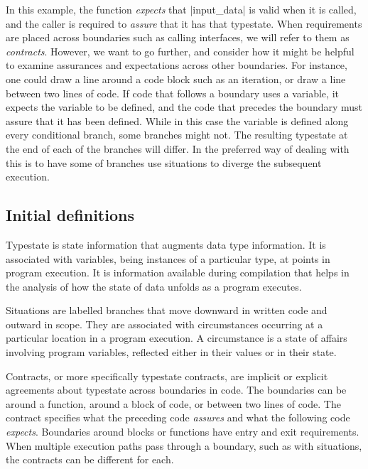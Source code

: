 \documentclass[10pt]{amsart}
\begin{document}
In this example, the function \emph{expects} that |input_data| is
valid when it is called, and the caller is required to \emph{assure}
that it has that typestate.  When requirements are placed across
boundaries such as calling interfaces, we will refer to them as
\emph{contracts}.  However, we want to go further, and consider how it
might be helpful to examine assurances and expectations across other
boundaries.  For instance, one could draw a line around a code block
such as an iteration, or draw a line between two lines of code.  If
code that follows a boundary uses a variable, it expects the variable
to be defined, and the code that precedes the boundary must assure
that it has been defined.  While in this case the variable is defined
along every conditional branch, some branches might not.  The
resulting typestate at the end of each of the branches will differ.
In \Utop the preferred way of dealing with this is to have some of
branches use situations to diverge the subsequent execution.


\subsection{Initial definitions}

\begin{defn}[Typestate]
  \label{defn:typestate1}%
  Typestate is state information that augments data type information.
  It is associated with variables, being instances of a particular
  type, at points in program execution.  It is information available
  during compilation that helps in the analysis of how the state of
  data unfolds as a program executes.
\end{defn}

\begin{defn}[Situations]
  \label{defn:situation1}%
  Situations are labelled branches that move downward in written code
  and outward in scope.
  They are associated with circumstances occurring at a particular
  location in a program execution.  A circumstance is a state of
  affairs involving program variables, reflected either in their
  values or in their state.
\end{defn}

\begin{defn}[Contracts]
  \label{defn:contract1}%
  Contracts, or more specifically typestate contracts, are implicit or
  explicit agreements about typestate across boundaries in code.  The
  boundaries can be around a function, around a block of code, or
  between two lines of code.  The contract specifies what the
  preceding code \emph{assures} and what the following code
  \emph{expects}.  Boundaries around blocks or functions have entry
  and exit requirements.  When multiple execution paths pass through a
  boundary, such as with situations, the contracts can be different
  for each.
\end{defn}
\end{document}
